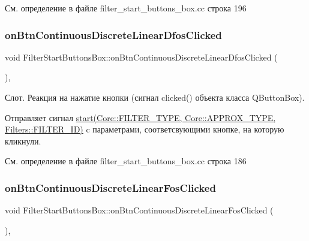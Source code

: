 См. определение в файле filter\+\_\+start\+\_\+buttons\+\_\+box.\+cc строка 196

\hypertarget{class_filter_start_buttons_box_a5d435bcb19360e97bf81205d21cc88ca}{}\label{class_filter_start_buttons_box_a5d435bcb19360e97bf81205d21cc88ca} 
\subsubsection{\texorpdfstring{on\+Btn\+Continuous\+Discrete\+Linear\+Dfos\+Clicked}{onBtnContinuousDiscreteLinearDfosClicked}}
{\footnotesize\ttfamily void Filter\+Start\+Buttons\+Box\+::on\+Btn\+Continuous\+Discrete\+Linear\+Dfos\+Clicked (\begin{DoxyParamCaption}{ }\end{DoxyParamCaption})\hspace{0.3cm}{\ttfamily [private]}, {\ttfamily [slot]}}

Слот. Реакция на нажатие кнопки (сигнал clicked() объекта класса Q\+Button\+Box).

Отправляет сигнал \hyperlink{class_filter_start_buttons_box_ac6e2a6555f1d388391f188f834b8e753}{start(\+Core\+::\+F\+I\+L\+T\+E\+R\+\_\+\+T\+Y\+P\+E, Core\+::\+A\+P\+P\+R\+O\+X\+\_\+\+T\+Y\+P\+E, Filters\+::\+F\+I\+L\+T\+E\+R\+\_\+\+I\+D)} c параметрами, соответсвующими кнопке, на которую кликнули. 

См. определение в файле filter\+\_\+start\+\_\+buttons\+\_\+box.\+cc строка 186

\hypertarget{class_filter_start_buttons_box_a469814e3d3b955558f80ac183f3450e7}{}\label{class_filter_start_buttons_box_a469814e3d3b955558f80ac183f3450e7} 
\subsubsection{\texorpdfstring{on\+Btn\+Continuous\+Discrete\+Linear\+Fos\+Clicked}{onBtnContinuousDiscreteLinearFosClicked}}
{\footnotesize\ttfamily void Filter\+Start\+Buttons\+Box\+::on\+Btn\+Continuous\+Discrete\+Linear\+Fos\+Clicked (\begin{DoxyParamCaption}{ }\end{DoxyParamCaption})\hspace{0.3cm}{\ttfamily [private]}, {\ttfamily [slot]}}

